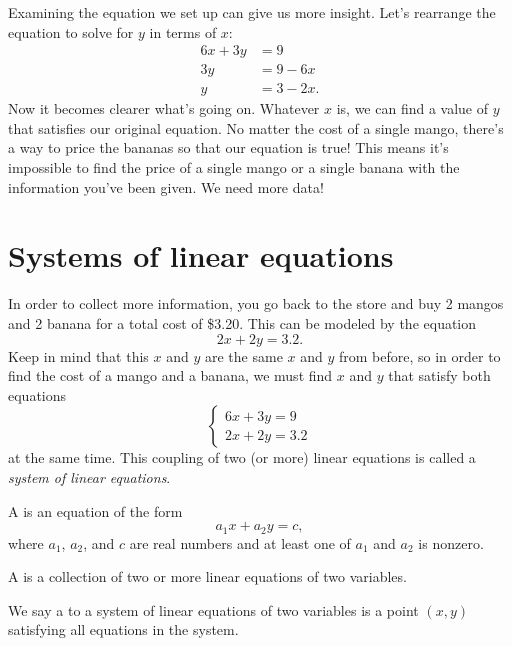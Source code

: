 \documentclass[nooutcomes]{ximera}
\begin{document}
Examining the equation we set up can give us more insight. Let's rearrange the equation to solve for $y$ in terms of $x$:
\begin{align*}
6x + 3y & = 9 \\
3y & = 9 - 6x \\
y & = 3 - 2x.
\end{align*}
Now it becomes clearer what's going on. Whatever $x$ is, we can find a value of $y$ that satisfies our original equation. No matter the cost of a single mango, there's a way to price the bananas so that our equation is true! This means it's impossible to find the price of a single mango or a single banana with the information you've been given. We need more data!



\section{Systems of linear equations}

In order to collect more information, you go back to the store and buy 2 mangos and 2 banana for a total cost of \$3.20. This can be modeled by the equation 
$$
2x + 2y = 3.2.
$$
Keep in mind that this $x$ and $y$ are the same $x$ and $y$ from before, so in order to find the cost of a mango and a banana, we must find $x$ and $y$ that satisfy both equations
$$
\begin{cases}
6x + 3y = 9 \\
2x + 2y = 3.2
\end{cases}
$$
at the same time. This coupling of two (or more) linear equations is called a \emph{system of linear equations}.

\begin{definition}
A  is an equation of the form
$$
a_1 x + a_2 y = c,
$$
where $a_1$, $a_2$, and $c$ are real numbers and at least one of $a_1$ and 	$a_2$ is nonzero.

A  is a collection of two or more linear equations of two variables.

We say a  to a system of linear equations of two variables is a point $(x, y)$ satisfying all equations in the system. 
\end{definition}
\end{document}
